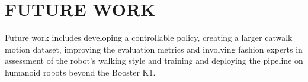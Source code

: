 \section{FUTURE WORK}

Future work includes developing a controllable policy, creating a larger catwalk motion dataset, improving the evaluation metrics and involving fashion experts in assessment of the robot's walking style and training and deploying the pipeline on humanoid robots beyond the Booster K1.
